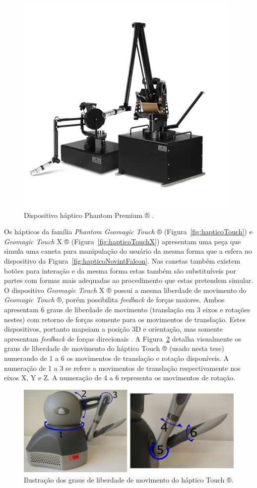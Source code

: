 \begin{figure}[ht!]
    \centering
    \includegraphics[width=0.4\linewidth]{capitulos/figuras/hapticoPhantomPremium.png}
    \caption{Dispositivo háptico Phantom Premium ® \cite{3DSystems2018}.}
    \label{fig:hapticoPremium}
\end{figure}

Os hápticos da família \textit{Phantom Geomagic Touch} ® (Figura~\ref{fig:hapticoTouch}) e \textit{Geomagic Touch} X ® (Figura~\ref{fig:hapticoTouchX}) apresentam uma peça que simula uma caneta para manipulação do usuário da mesma forma que a esfera no dispositivo da Figura~\ref{fig:hapticoNovintFalcon}. Nas canetas também existem botões para interação e da mesma forma estas também são substituíveis por partes com formas mais adequadas ao procedimento que estas pretendem simular. O dispositivo \textit{Geomagic Touch} X ® possui a mesma liberdade de movimento do \textit{Geomagic Touch} ®, porém possibilita \textit{feedback} de forças maiores. Ambos apresentam 6 graus de liberdade de movimento (translação em 3 eixos e rotações nestes) com retorno de forças somente para os movimentos de translação. Estes dispositivos, portanto mapeiam a posição 3D e orientação, mas somente apresentam \textit{feedback} de forças direcionais \cite{Forsslund2013}. A Figura~\ref{fig:hapticoTouchDoFs} detalha visualmente os graus de liberdade de movimento do háptico Touch ® (usado nesta tese) numerando de 1 a 6 os movimentos de translação e rotação disponíveis. A numeração de 1 a 3 se refere a movimentos de translação respectivamente nos eixos X, Y e Z. A numeração de 4 a 6 representa os movimentos de rotação.

\begin{figure}[ht!]
    \centering
    \includegraphics[width=0.5\linewidth]{capitulos/figuras/Haptico-Touch-DoF.png}
    \caption{Ilustração dos graus de liberdade de movimento do háptico Touch ®.}
    \label{fig:hapticoTouchDoFs}
\end{figure}

